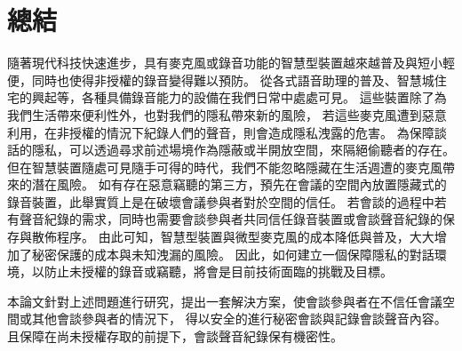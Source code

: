 \chapter{總結}\label{chapter:conclusion}

    隨著現代科技快速進步，具有麥克風或錄音功能的智慧型裝置越來越普及與短小輕便，同時也使得非授權的錄音變得難以預防。
從各式語音助理的普及、智慧城住宅的興起等，各種具備錄音能力的設備在我們日常中處處可見。
這些裝置除了為我們生活帶來便利性外，也對我們的隱私帶來新的風險，
若這些麥克風遭到惡意利用，在非授權的情況下紀錄人們的聲音，則會造成隱私洩露的危害。
為保障談話的隱私，可以透過尋求前述場境作為隱蔽或半開放空間，來隔絕偷聽者的存在。
但在智慧裝置隨處可見隨手可得的時代，我們不能忽略隱藏在生活週遭的麥克風帶來的潛在風險。
如有存在惡意竊聽的第三方，預先在會議的空間內放置隱藏式的錄音裝置，此舉實質上是在破壞會議參與者對於空間的信任。
若會談的過程中若有聲音紀錄的需求，同時也需要會談參與者共同信任錄音裝置或會談聲音紀錄的保存與散佈程序。
由此可知，智慧型裝置與微型麥克風的成本降低與普及，大大增加了秘密保護的成本與未知洩漏的風險。
因此，如何建立一個保障隱私的對話環境，以防止未授權的錄音或竊聽，將會是目前技術面臨的挑戰及目標。

    本論文針對上述問題進行研究，提出一套解決方案，使會談參與者在不信任會議空間或其他會談參與者的情況下，
得以安全的進行秘密會談與記錄會談聲音內容。且保障在尚未授權存取的前提下，會談聲音紀錄保有機密性。
